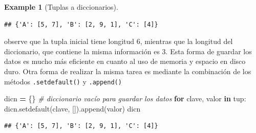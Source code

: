 \documentclass[
]{book}
\newenvironment{Shaded}{\begin{snugshade}}{\end{snugshade}}
\newcommand{\CommentTok}[1]{\textcolor[rgb]{0.56,0.35,0.01}{\textit{#1}}}
\newcommand{\ControlFlowTok}[1]{\textcolor[rgb]{0.13,0.29,0.53}{\textbf{#1}}}
\newcommand{\KeywordTok}[1]{\textcolor[rgb]{0.13,0.29,0.53}{\textbf{#1}}}
\newcommand{\NormalTok}[1]{#1}
\newcommand{\OperatorTok}[1]{\textcolor[rgb]{0.81,0.36,0.00}{\textbf{#1}}}
\theoremstyle{definition}
\theoremstyle{definition}
\newtheorem{example}{Example}[chapter]
\theoremstyle{definition}
\theoremstyle{definition}
\theoremstyle{remark}
\begin{document}
\begin{example}[Tuplas a diccionarios]
\begin{verbatim}
## {'A': [5, 7], 'B': [2, 9, 1], 'C': [4]}
\end{verbatim}

observe que la tupla inicial tiene longitud 6, mientras que la longitud del diccionario, que contiene la misma información es 3. Esta forma de guardar los datos es mucho más eficiente en cuanto al uso de memoria y espacio en disco duro. Otra forma de realizar la misma tarea es mediante la combinación de los métodos \texttt{.setdefault()} y \texttt{.append()}

\begin{Shaded}
\begin{Highlighting}[]
\NormalTok{dicn }\OperatorTok{=}\NormalTok{ \{\} }\CommentTok{\# diccionario vacío para guardar los datos  }
\ControlFlowTok{for}\NormalTok{ clave, valor }\KeywordTok{in}\NormalTok{ tup:}
\NormalTok{    dicn.setdefault(clave, []).append(valor)}
\NormalTok{dicn }
\end{Highlighting}
\end{Shaded}

\begin{verbatim}
## {'A': [5, 7], 'B': [2, 9, 1], 'C': [4]}
\end{verbatim}

\end{example}
\end{document}
